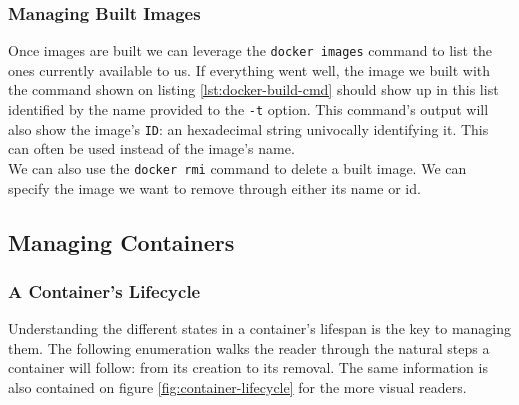             \subsubsection{Managing Built Images}
                Once images are built we can leverage the \texttt{docker images} command to list the ones currently available to us. If everything went well, the image we built with the command shown on listing \ref{lst:docker-build-cmd} should show up in this list identified by the name provided to the \texttt{-t} option. This command's output will also show the image's \texttt{ID}: an hexadecimal string univocally identifying it. This can often be used instead of the image's name.\\

                We can also use the \texttt{docker rmi} command to delete a built image. We can specify the image we want to remove through either its name or id.\\

        \subsection{Managing Containers}
            \subsubsection{A Container's Lifecycle}
                Understanding the different states in a container's lifespan is the key to managing them. The following enumeration walks the reader through the natural steps a container will follow: from its creation to its removal. The same information is also contained on figure \ref{fig:container-lifecycle} for the more visual readers.\\

